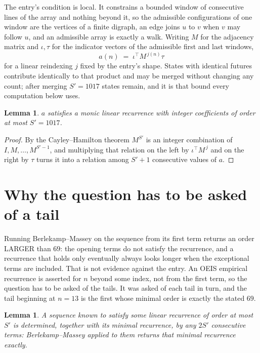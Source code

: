 \documentclass[11pt,a4paper]{article}
\theoremstyle{plain}
\newtheorem{lemma}[theorem]{Lemma}
\theoremstyle{definition}
\begin{document}
The entry's condition is local. It constrains a bounded window of consecutive lines of the
array and nothing beyond it, so the admissible configurations of one window are the vertices of
a finite digraph, an edge joins $u$ to $v$ when $v$ may follow $u$, and an admissible array is
exactly a walk. Writing $M$ for the adjacency matrix and $\iota,\tau$ for the indicator vectors
of the admissible first and last windows,
\[
a(n)\;=\;\iota^{\!\top}M^{\,j(n)}\tau
\]
for a linear reindexing $j$ fixed by the entry's shape. States with identical futures
contribute identically to that product and may be merged without changing any count; after
merging $S'=1017$ states remain, and it is that bound every computation below uses.

\begin{lemma}\label{lem:cf}
$a$ satisfies a monic linear recurrence with integer coefficients of order at most $S'=1017$.
\end{lemma}

\begin{proof}
By the Cayley--Hamilton theorem $M^{S'}$ is an integer combination of $I,M,\dots,M^{S'-1}$,
and multiplying that relation on the left by $\iota^{\!\top}M^{\,j}$ and on the right by
$\tau$ turns it into a relation among $S'+1$ consecutive values of $a$.
\end{proof}

\section{Why the question has to be asked of a tail}

Running Berlekamp--Massey on the sequence from its first term returns an order LARGER than $69$: the opening terms do not satisfy the recurrence, and a recurrence that holds only eventually always looks longer when the exceptional terms are included. That is not evidence against the entry. An OEIS empirical recurrence is asserted for $n$ beyond some index, not from the first term, so the question has to be asked of the tails. It was asked of each tail in turn, and the tail beginning at $n=13$ is the first whose minimal order is exactly the stated $69$.

\begin{lemma}\label{lem:bm}
A sequence known to satisfy some linear recurrence of order at most $S'$ is determined,
together with its minimal recurrence, by any $2S'$ consecutive terms: Berlekamp--Massey applied
to them returns that minimal recurrence exactly.
\end{lemma}
\end{document}
